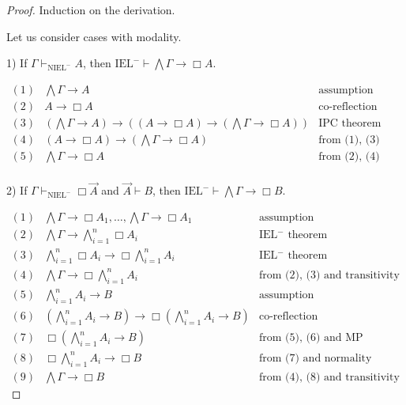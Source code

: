 \documentclass[a4paper]{article}
\begin{document}
  \begin{proof}
Induction on the derivation.

  \vspace{\baselineskip}

Let us consider cases with modality.

\vspace{\baselineskip}

1) If $\Gamma \vdash_{\text{NIEL}^{-}} A$, then $\text{IEL}^{-} \vdash \bigwedge \Gamma \rightarrow \Box A$.

$\begin{array}{lll}
(1) & \bigwedge \Gamma \rightarrow A & \text{assumption}\\
(2) & A \rightarrow \Box A &\text{co-reflection}\\
(3) & (\bigwedge \Gamma \rightarrow A) \rightarrow ((A \rightarrow \Box A) \rightarrow (\bigwedge \Gamma \rightarrow \Box A))&\text{IPC theorem}\\
(4) & (A \rightarrow \Box A) \rightarrow (\bigwedge \Gamma \rightarrow \Box A) &\text{from (1), (3) and MP}\\
(5) & \bigwedge \Gamma \rightarrow \Box A &\text{from (2), (4) and MP}\\
\end{array}$

\vspace{\baselineskip}

2) If $\Gamma \vdash_{\text{NIEL}^{-}} \Box \vec{A}$ and $\vec{A} \vdash B$, then $\text{IEL}^{-} \vdash \bigwedge \Gamma \rightarrow \Box B$.

$\begin{array}{lll}
(1) &\bigwedge \Gamma \rightarrow \Box A_1, \dots, \bigwedge \Gamma \rightarrow \Box A_1 & \text{assumption} \\
(2) &\bigwedge \Gamma \rightarrow \bigwedge \limits_{i = 1}^{n} \Box A_i & \text{IEL$^{-}$ theorem} \\
(3) &\bigwedge \limits_{i = 1}^{n} \Box A_i \rightarrow \Box \bigwedge \limits_{i = 1}^{n} A_i & \text{IEL$^{-}$ theorem} \\
(4) &\bigwedge \Gamma \rightarrow \Box \bigwedge \limits_{i = 1}^{n} A_i & \text{from (2), (3) and transitivity} \\
(5) &\bigwedge \limits_{i = 1}^{n} A_i \rightarrow B& \text{assumption} \\
(6) &(\bigwedge \limits_{i = 1}^{n} A_i \rightarrow B) \rightarrow \Box (\bigwedge \limits_{i = 1}^{n} A_i \rightarrow B)& \text{co-reflection}\\
(7) &\Box (\bigwedge \limits_{i = 1}^{n} A_i \rightarrow B)& \text{from (5), (6) and MP} \\
(8) &\Box \bigwedge \limits_{i = 1}^{n} A_i \rightarrow \Box B & \text{from (7) and normality} \\
(9) &\bigwedge \Gamma \rightarrow \Box B & \text{from (4), (8) and transitivity}
\end{array}$

  \end{proof}
\end{document}
